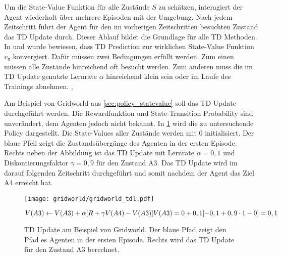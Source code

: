 Um die State-Value Funktion für alle Zustände $S$ zu schätzen, interagiert der Agent wiederholt über mehrere Episoden mit der Umgebung. 
Nach jedem Zeitschritt führt der Agent für den im vorherigen Zeitschritten besuchten Zustand das \ac{TD} Update durch. 
Dieser Ablauf bildet die Grundlage für alle \ac{TD} Methoden. \cite[S. 121]{suttonReinforcementLearningIntroduction2018}
In \cite{suttonLearningPredictMethods1988} und \cite{watkinsQlearning1992} wurde bewiesen, dass \ac{TD} Prediction zur wirklichen State-Value Funktion $v_\pi$ konvergiert. 
Dafür müssen zwei Bedingungen erfüllt werden. 
Zum einen müssen alle Zustände hinreichend oft besucht werden. 
Zum anderen muss die im \ac{TD} Update genutzte Lernrate $\alpha$ hinreichend klein sein oder im Laufe des Trainings abnehmen. \cite[S. 33, S. 124]{suttonReinforcementLearningIntroduction2018}, \cite[S. 285 f.]{watkinsQlearning1992}

Am Beispiel von Gridworld aus \cref{sec:policy_statevalue} soll das \ac{TD} Update durchgeführt werden. 
Die Rewardfunktion und State-Transition Probability sind unverändert, dem Agenten jedoch nicht bekannt. 
In \cref{fig:gridworld_tdl} wird die zu untersuchende Policy dargestellt.
Die State-Values aller Zustände werden mit 0 initialisiert. 
Der blaue Pfeil zeigt die Zustandsübergänge des Agenten in der ersten Episode. 
Rechts neben der Abbildung ist das \ac{TD} Update mit Lernrate $\alpha=0,1$ und Diskontierungsfaktor $\gamma=0,9$ für den Zustand A3. 
Das \ac{TD} Update wird im darauf folgenden Zeitschritt durchgeführt und somit nachdem der Agent das Ziel A4 erreicht hat.

\begin{figure}
   \begin{minipage}[c]{.5\textwidth}
   \centering
    \texttt{[image: gridworld/gridworld\_tdl.pdf]}
   \end{minipage}%
   \begin{minipage}[c]{.5\textwidth}
    $V(A3) \leftarrow V(A3)+ \alpha[R+\gamma V(A4)-V(A3)]\\
V(A3) = 0+0,1[-0,1+0,9 \cdot 1-0]=0,1$
   \end{minipage}
   \caption[\acs{TD} Update am Beispiel von Gridworld]{\acs{TD} Update am Beispiel von Gridworld. Der blaue Pfad zeigt den Pfad es Agenten in der ersten Episode. Rechts wird das \ac{TD} Update für den Zustand A3 berechnet. \protect\footnotemark}
   \label{fig:gridworld_tdl}
\end{figure}

